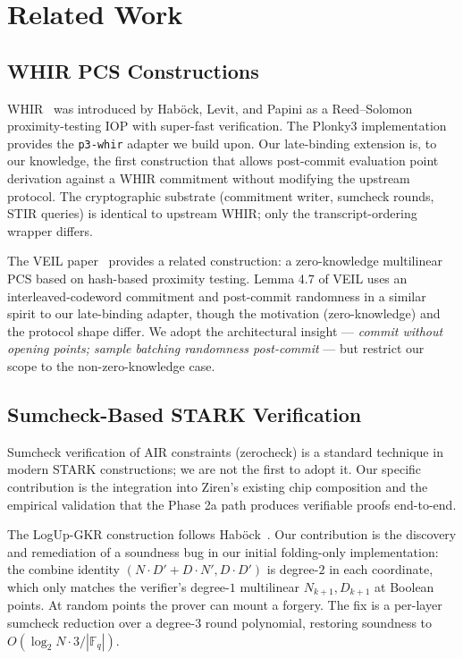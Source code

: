 \section{Related Work}
\label{sec:related-work}

\subsection{WHIR PCS Constructions}

WHIR~\cite{whir2024} was introduced by Hab\"ock, Levit, and Papini
as a Reed--Solomon proximity-testing IOP with super-fast
verification.  The Plonky3 implementation~\cite{plonky3} provides
the \texttt{p3-whir} adapter we build upon.  Our late-binding
extension is, to our knowledge, the first construction that allows
post-commit evaluation point derivation against a WHIR commitment
without modifying the upstream protocol.  The cryptographic
substrate (commitment writer, sumcheck rounds, STIR queries) is
identical to upstream WHIR; only the transcript-ordering wrapper
differs.

The VEIL paper~\cite{veil2026} provides a related construction:
a zero-knowledge multilinear PCS based on hash-based proximity
testing.  Lemma 4.7 of VEIL uses an interleaved-codeword commitment
and post-commit randomness in a similar spirit to our late-binding
adapter, though the motivation (zero-knowledge) and the protocol
shape differ.  We adopt the architectural insight ---
\emph{commit without opening points; sample batching randomness
post-commit} --- but restrict our scope to the non-zero-knowledge
case.

\subsection{Sumcheck-Based STARK Verification}

Sumcheck verification of AIR constraints (zerocheck) is a standard
technique in modern STARK constructions; we are not the first to
adopt it.  Our specific contribution is the integration into Ziren's
existing chip composition and the empirical validation that the
Phase 2a path produces verifiable proofs end-to-end.

The LogUp-GKR construction follows Hab\"ock~\cite{logup-gkr}.  Our
contribution is the discovery and remediation of a soundness bug
in our initial folding-only implementation: the combine identity
$(N \cdot D' + D \cdot N', D \cdot D')$ is degree-$2$ in each
coordinate, which only matches the verifier's degree-$1$
multilinear $N_{k+1}, D_{k+1}$ at Boolean points.  At random points
the prover can mount a forgery.  The fix is a per-layer sumcheck
reduction over a degree-$3$ round polynomial, restoring soundness
to $O(\log_2 N \cdot 3 / |\mathbb{F}_q|)$.

